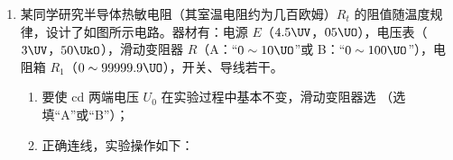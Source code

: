 \documentclass[\gkver]{gaokaozhenti}
\begin{document}
\begin{enumerate}
\begin{enumerate}
\item
只做以下改变，一定会增大图中电流表指针偏转角度的是 （多选）

A．磁铁静止，向上移动线圈

B．增大（1）中磁铁运动速度

C．将导线从接线柱 $G_{1}$ 移接至接线柱 $G_{0}$

D．将一个未与电路相接的闭合线圈套在图中线圈外
\end{enumerate}



\item
某同学研究半导体热敏电阻（其室温电阻约为几百欧姆）$R_{t}$ 的阻值随温度规律，设计了如图所示电路。器材有：电源 $E$（$4.5 \UV$，$05 \UO$），电压表（$3 \UV$，$50 \UkO$），滑动变阻器 $R$（A：“$0 \sim 10 \UO$”或 B：“$0 \sim 100 \UO$”），电阻箱 $R_{1}$（$0 \sim 99999.9 \UO$），开关、导线若干。

\begin{enumerate}
\item
要使 cd 两端电压 $U_{0}$ 在实验过程中基本不变，滑动变阻器选 （选填“A”或“B”）；

\item
正确连线，实验操作如下：


\end{enumerate}
\end{enumerate}
\end{document}
